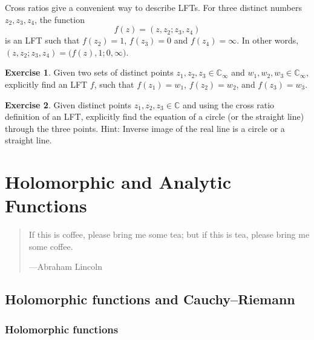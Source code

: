 \documentclass[12pt,openany]{book}
\newcommand{\C}{{\mathbb{C}}}
\theoremstyle{plain}
\theoremstyle{remark}
\theoremstyle{definition}
\newenvironment{exbox}{%
    \def\FrameCommand{\vrule width 1pt \relax\hspace{10pt}}%
    \MakeFramed{\advance\hsize-\width\FrameRestore}%
}{%
    \endMakeFramed
}
\newenvironment{myepigraph}{%
    \begin{quote}%
    \begingroup\itshape
}{%
    \endgroup%
    \end{quote}
}
\theoremstyle{exercise}
\newtheorem{exercise}{Exercise}[section]
\theoremstyle{example}
\begin{document}
Cross ratios give a convenient way to describe LFTs.
For three distinct numbers $z_2,z_3,z_4$, the
function
\begin{equation*}
f(z) =
(z,z_2;z_3,z_4)
\end{equation*}
is an LFT such that $f(z_2) = 1$, $f(z_3)=0$ and $f(z_4) = \infty$.
In other words,
$(z,z_2;z_3,z_4) = 
\bigl(f(z),1;0,\infty\bigr)$.

\begin{exbox}
\begin{exercise}
Given two sets of distinct points $z_1,z_2,z_3 \in \C_\infty$
and $w_1,w_2,w_3 \in \C_\infty$, explicitly find an LFT $f$,
such that
$f(z_1) = w_1$,
$f(z_2) = w_2$, and
$f(z_3) = w_3$.
\end{exercise}

\begin{exercise}
Given distinct points $z_1,z_2,z_3 \in \C$ and
using the cross ratio definition of an LFT\@, explicitly find
the equation of a circle (or the straight line) through the three points.
Hint: Inverse image of the real line is a circle or a straight line.
\end{exercise}
\end{exbox}



\chapter{Holomorphic and Analytic Functions} \label{ch:holanal}

\begin{myepigraph}
If this is coffee, please bring me some tea; but if this is tea, please bring me some coffee.

---Abraham Lincoln
\end{myepigraph}


\section{Holomorphic functions and Cauchy--Riemann}
\label{sec:holfuncs}

\subsection{Holomorphic functions}
\end{document}
